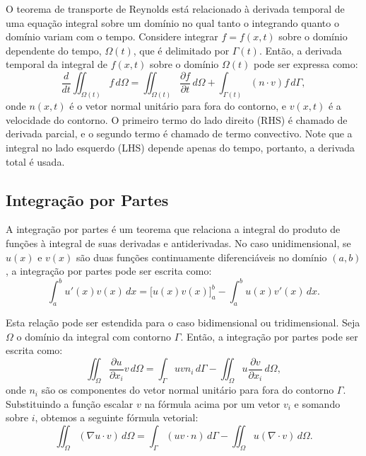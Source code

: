 {	O teorema de transporte de Reynolds está relacionado à derivada temporal de uma equação integral sobre um domínio no qual tanto o integrando quanto o domínio variam com o tempo. Considere integrar $f = f(x, t)$ sobre o domínio dependente do tempo, $\Omega(t)$, que é delimitado por $\Gamma(t)$. Então, a derivada temporal da integral de $f(x, t)$ sobre o domínio $\Omega(t)$ pode ser expressa como:
	\begin{equation}
		\frac{d}{dt} \iint_{\Omega(t)} f \, d\Omega = \iint_{\Omega(t)} \frac{\partial f}{\partial t} \, d\Omega + \int_{\Gamma(t)} (n \cdot v) f \, d\Gamma, \tag{1.29}
	\end{equation}
	onde $n(x, t)$ é o vetor normal unitário para fora do contorno, e $v(x, t)$ é a velocidade do contorno. O primeiro termo do lado direito (RHS) é chamado de derivada parcial, e o segundo termo é chamado de termo convectivo. Note que a integral no lado esquerdo (LHS) depende apenas do tempo, portanto, a derivada total é usada.
	
	\subsection*{Integração por Partes}
	
	A integração por partes é um teorema que relaciona a integral do produto de funções à integral de suas derivadas e antiderivadas. No caso unidimensional, se $u(x)$ e $v(x)$ são duas funções continuamente diferenciáveis no domínio $(a, b)$, a integração por partes pode ser escrita como:
	\begin{equation}
		\int_a^b u'(x) v(x) \, dx = \big[ u(x) v(x) \big]_a^b - \int_a^b u(x) v'(x) \, dx.
	\end{equation}
	
	Esta relação pode ser estendida para o caso bidimensional ou tridimensional. Seja $\Omega$ o domínio da integral com contorno $\Gamma$. Então, a integração por partes pode ser escrita como:
	\begin{equation}
		\iint_\Omega \frac{\partial u}{\partial x_i} v \, d\Omega = \int_\Gamma u v n_i \, d\Gamma - \iint_\Omega u \frac{\partial v}{\partial x_i} \, d\Omega,
	\end{equation}
	onde $n_i$ são os componentes do vetor normal unitário para fora do contorno $\Gamma$. Substituindo a função escalar $v$ na fórmula acima por um vetor $v_i$ e somando sobre $i$, obtemos a seguinte fórmula vetorial:
	\begin{equation}
		\iint_\Omega (\nabla u \cdot v) \, d\Omega = \int_\Gamma (u v \cdot n) \, d\Gamma - \iint_\Omega u (\nabla \cdot v) \, d\Omega. \tag{1.30}
	\end{equation}
	
}
